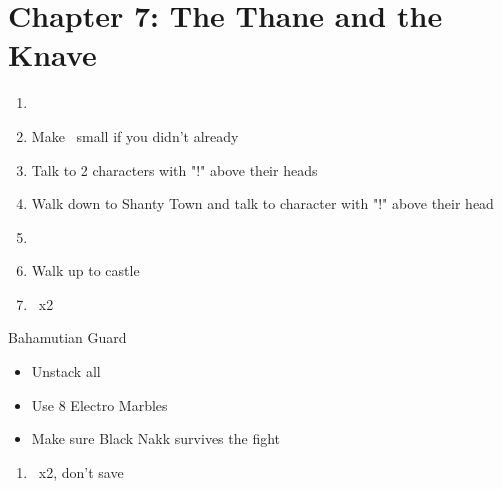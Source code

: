 \chapter{Chapter 7: The Thane and the Knave}
\begin{enumerate}
	\item \cs
	\item Make \lann\ small if you didn't already
	\item Talk to 2 characters with "!" above their heads
	\item Walk down to Shanty Town and talk to character with "!" above their head
	\item \cs
	\item Walk up to castle
	\item \cs\ x2
\end{enumerate}
\begin{battle}[]{Bahamutian Guard}
	\begin{itemize}
		\item Unstack all
		\item Use 8 Electro Marbles
		\item Make sure Black Nakk survives the fight
	\end{itemize}
\end{battle}
\begin{enumerate}[resume]
	\item \cs\ x2, don't save
\end{enumerate}